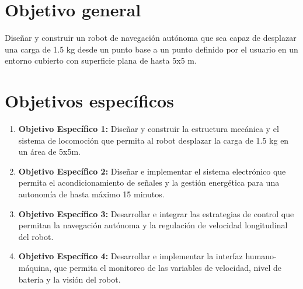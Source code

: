 
\section{Objetivo general}
\label{sec:objetivo-general}

Diseñar y construir un robot de navegación autónoma que sea capaz de desplazar una carga de 1.5 kg desde un punto base a un punto definido por el usuario en un entorno cubierto con superficie plana de hasta 5x5 m.

\section{Objetivos específicos}
\label{sec:objetivos-especificos}

\begin{enumerate}
    \item \textbf{Objetivo Específico 1:} Diseñar y construir la estructura mecánica y el sistema de locomoción que permita al robot desplazar la carga de 1.5 kg en un área de 5x5m.
    \item \textbf{Objetivo Específico 2:} Diseñar e implementar el sistema electrónico que permita el acondicionamiento de señales y la gestión energética para una autonomía de hasta máximo 15 minutos.
    \item \textbf{Objetivo Específico 3:} Desarrollar e integrar las estrategias de control que permitan la navegación autónoma y la regulación de velocidad longitudinal del robot.
    \item \textbf{Objetivo Específico 4:} Desarrollar e implementar la interfaz humano-máquina, que permita el monitoreo de las variables de velocidad, nivel de batería y la visión del robot.
\end{enumerate}
